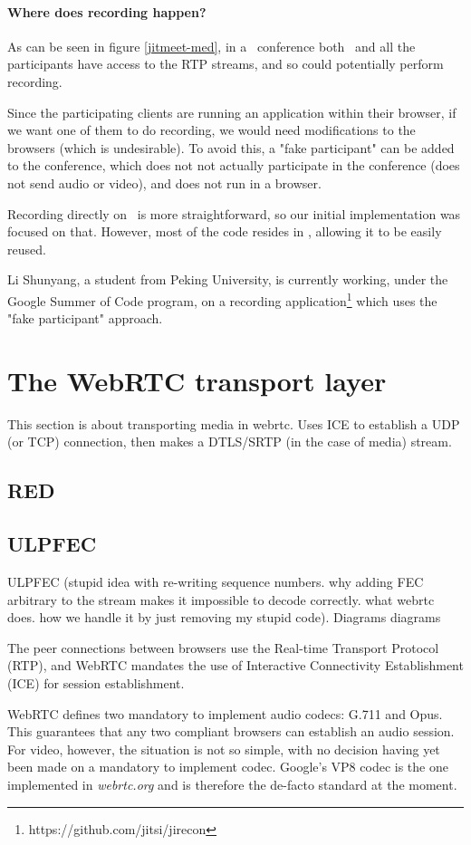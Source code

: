\documentclass[twoside,openright,a4paper,11pt,english]{article}
\begin{document}
\paragraph*{Where does recording happen?}
As can be seen in figure \ref{jitmeet-med}, in a \jm\ conference both \jvb\ and
all the participants have access to the RTP streams, and so could potentially
perform recording.

Since the participating clients are running an application within their
browser, if we want one of them to do recording, we would need modifications to
the browsers (which is undesirable). To avoid this, a "fake participant" can
be added to the conference, which does not not actually participate in the conference
(does not send audio or video), and does not run in a browser.

Recording directly on \jvb\ is more straightforward, so our initial
implementation was focused on that. However, most of the code resides in \lj, allowing
it to be easily reused.

Li Shunyang, a student from Peking University, is currently working, under the
Google Summer of Code program, on a recording
application\footnote{https://github.com/jitsi/jirecon} which uses
the "fake participant" approach.




\section{The WebRTC transport layer}
This section is about transporting media in webrtc. Uses ICE to establish a
UDP (or TCP) connection, then makes a DTLS/SRTP (in the case of media) stream.
\subsection{RED}
\subsection{ULPFEC}
ULPFEC (stupid idea with re-writing sequence numbers. why adding FEC arbitrary to the stream makes it impossible to decode correctly. what webrtc does. how we handle it by just removing my stupid code). Diagrams
diagrams

\bigskip
The peer connections between browsers use the Real-time Transport Protocol (RTP\cite{rtp}), and WebRTC mandates the use of
Interactive Connectivity Establishment (ICE\cite{ice}) for session establishment.

WebRTC defines two mandatory to implement audio codecs: G.711\cite{g711} and
Opus\cite{opus, opusrtp}. This guarantees that any two compliant browsers can establish
an audio session. For video, however, the situation is not so simple, with no
decision having yet been made on a mandatory to implement codec. Google's VP8\cite{vp8}
codec is the one implemented in \emph{webrtc.org} and is therefore the de-facto
standard at the moment.
\end{document}
